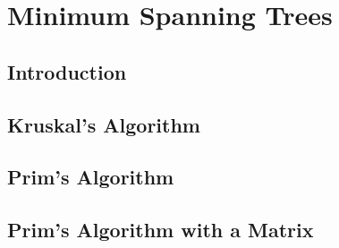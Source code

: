 \documentclass[../maths.tex]{subfiles}
\begin{document}
\chapter{Minimum Spanning Trees}
\section{Introduction}
\section{Kruskal's Algorithm}
\section{Prim's Algorithm}
\section{Prim's Algorithm with a Matrix}
\end{document}
